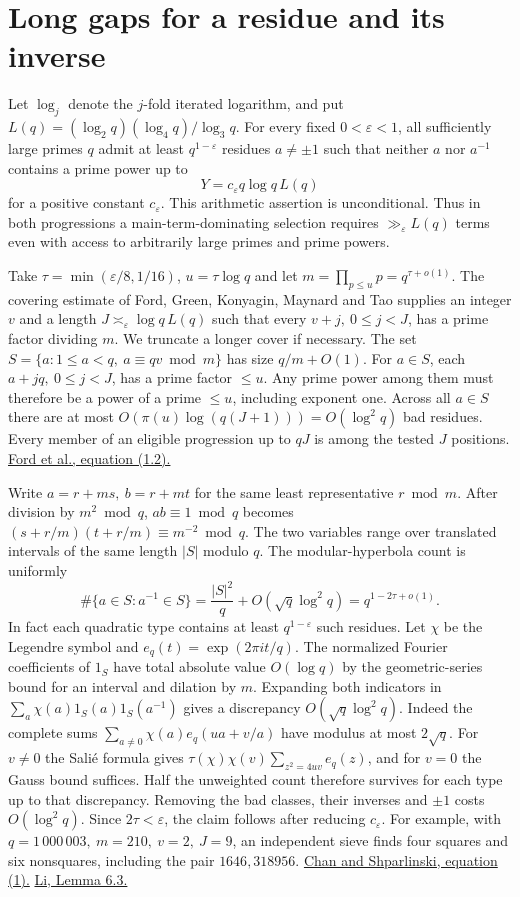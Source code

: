 \documentclass[11pt,a4paper]{article}
\newcommand{\head}[1]{\section*{\color{ink}#1}}
\begin{document}
\newpage
\head{Long gaps for a residue and its inverse}
Let \(\log_j\) denote the \(j\)-fold iterated logarithm, and put
\(L(q)=(\log_2q)(\log_4q)/\log_3q\). For every fixed \(0<\varepsilon<1\),
all sufficiently large primes \(q\) admit at least \(q^{1-\varepsilon}\)
residues \(a\ne\pm1\) such that neither \(a\) nor \(a^{-1}\) contains a
prime power up to
\[
 Y=c_\varepsilon q\log q\,L(q)
\]
for a positive constant \(c_\varepsilon\). This arithmetic assertion is
unconditional. Thus in both progressions a main-term-dominating selection
requires \(\gg_\varepsilon L(q)\) terms even with access to arbitrarily
large primes and prime powers.

Take \(\tau=\min(\varepsilon/8,1/16)\), \(u=\tau\log q\) and let
\(m=\prod_{p\le u}p=q^{\tau+o(1)}\). The covering estimate of Ford, Green,
Konyagin, Maynard and Tao supplies an integer \(v\) and a length
\(J\asymp_\varepsilon\log q\,L(q)\) such that every \(v+j,\ 0\le j<J\),
has a prime factor dividing \(m\). We truncate a longer cover if necessary.
The set \(S=\{a:1\le a<q,\ a\equiv qv\bmod m\}\) has size \(q/m+O(1)\).
For \(a\in S\), each \(a+jq,\ 0\le j<J\), has a prime factor \(\le u\).
Any prime power among them must therefore be a power of a prime \(\le u\),
including exponent one. Across all \(a\in S\) there are at most
\(O(\pi(u)\log(q(J+1)))=O(\log^2q)\) bad residues. Every member of an
eligible progression up to \(qJ\) is among the tested \(J\) positions.
\href{https://arxiv.org/pdf/1412.5029#page=3}{Ford et al., equation (1.2).}

Write \(a=r+ms,\ b=r+mt\) for the same least representative \(r\bmod m\).
After division by \(m^2\bmod q\), \(ab\equiv1\bmod q\) becomes
\((s+r/m)(t+r/m)\equiv m^{-2}\bmod q\). The two variables range over
translated intervals of the same length \(|S|\) modulo \(q\).
The modular-hyperbola count is uniformly
\[
 \#\{a\in S:a^{-1}\in S\}=\frac{|S|^2}{q}
              +O(\sqrt q\log^2q)=q^{1-2\tau+o(1)} .
\]
In fact each quadratic type contains at least \(q^{1-\varepsilon}\) such residues.
Let \(\chi\) be the Legendre symbol and \(e_q(t)=\exp(2\pi i t/q)\).
The normalized Fourier coefficients of \(1_S\) have total absolute value
\(O(\log q)\) by the geometric-series bound for an interval and dilation by \(m\).
Expanding both indicators in \(\sum_a\chi(a)1_S(a)1_S(a^{-1})\)
gives a discrepancy \(O(\sqrt q\log^2q)\). Indeed the complete sums
\(\sum_{a\ne0}\chi(a)e_q(ua+v/a)\) have modulus at most \(2\sqrt q\).
For \(v\ne0\) the Sali\'e formula gives
\(\tau(\chi)\chi(v)\sum_{z^2=4uv} e_q(z)\), and for \(v=0\) the
Gauss bound suffices. Half the unweighted count therefore survives for
each type up to that discrepancy. Removing the bad classes, their inverses
and \(\pm1\) costs \(O(\log^2q)\). Since \(2\tau<\varepsilon\), the
claim follows after reducing \(c_\varepsilon\).
For example, with \(q=1\,000\,003,\ m=210,\ v=2,\ J=9\), an independent
sieve finds four squares and six nonsquares, including the pair \(1646,318956\).
\href{https://doi.org/10.4064/aa142-1-5}{Chan and Shparlinski, equation (1).}
\href{https://www.math.ucdavis.edu/~junxian/paper/DivisorTichmarsh5.pdf\#page=18}{Li, Lemma 6.3.}
\end{document}

